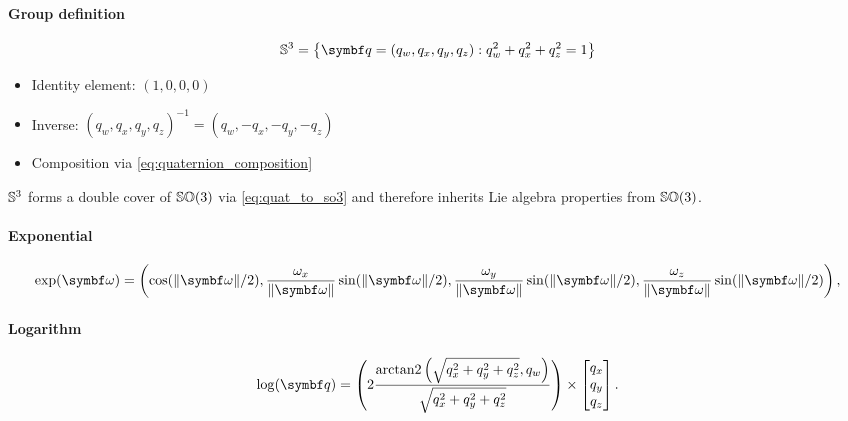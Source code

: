 \begin{properties}[breakable, title={The unit quaternion group $\Sthree$}]
  \paragraph{Group definition}
  \begin{equation}
    \Sthree = \left\{ \bq = (q_{w}, q_{x}, q_{y}, q_{z}) : q_{w}^{2} + q_{x}^{2} + q_{z}^{2} = 1 \right\}
  \end{equation}
  \begin{itemize}
    \item Identity element: $(1, 0, 0, 0)$
    \item Inverse: $(q_{w}, q_{x}, q_{y}, q_{z})^{-1} = (q_{w}, -q_{x}, -q_{y}, -q_{z})$
    \item Composition via \eqref{eq:quaternion_composition}
  \end{itemize}
  $\Sthree$ forms a double cover of ${\mathbb{SO}(3)}$ via \eqref{eq:quat_to_so3} and therefore inherits Lie algebra properties from ${\mathbb{SO}(3)}$.

  \paragraph{Exponential}
  \begin{equation}
    \label{eq:s3_exp}\exp (\bomega) = \left(
    \cos (\| \bomega \|/2), \frac{\omega_x}{\| \bomega \|} \sin (\| \bomega \|/2), \frac{\omega_y}{\| \bomega \|} \sin (\| \bomega \|/2), \frac{\omega_z}{\| \bomega \|} \sin ( \| \bomega \|/2 ) \right),
  \end{equation}

  \paragraph{Logarithm}
  \begin{equation}
    \label{eq:s3_log} \log (\bq)          = \left( 2 \frac{ \arctantwo \left(\sqrt{q_x^2 + q_y^2 + q_z^2}, q_w \right) }{ \sqrt{q_x^2 + q_y^2 + q_z^2} } \right) \times \begin{bmatrix} q_{x} \\ q_{y} \\ q_{z} \end{bmatrix}.
  \end{equation}

\end{properties}

